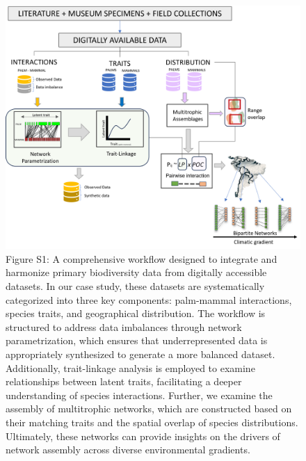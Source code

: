 \documentclass[
]{agujournal2019}
\begin{document}
\begin{figure}[H]

{\centering \includegraphics{Sup_figures/00_figure_data_pipeline.png}

}

\caption{Figure S1: A comprehensive workflow designed to integrate and
harmonize primary biodiversity data from digitally accessible datasets.
In our case study, these datasets are systematically categorized into
three key components: palm-mammal interactions, species traits, and
geographical distribution. The workflow is structured to address data
imbalances through network parametrization, which ensures that
underrepresented data is appropriately synthesized to generate a more
balanced dataset. Additionally, trait-linkage analysis is employed to
examine relationships between latent traits, facilitating a deeper
understanding of species interactions. Further, we examine the assembly
of multitrophic networks, which are constructed based on their matching
traits and the spatial overlap of species distributions. Ultimately,
these networks can provide insights on the drivers of network assembly
across diverse environmental gradients.}

\end{figure}%
\end{document}
